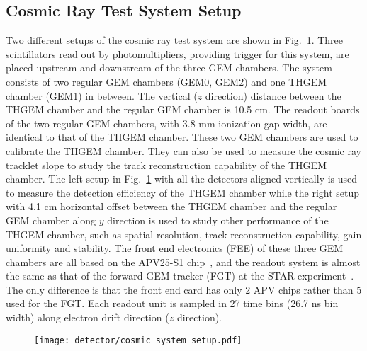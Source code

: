 \subsection{Cosmic Ray Test System Setup}\label{systemsetup}
Two different setups of the cosmic ray test system are shown in Fig.~\ref{cosmic_system_setup}. Three scintillators read out by photomultipliers, providing trigger for this system, are placed upstream and downstream of the three GEM chambers. The system consists of two regular GEM chambers (GEM0, GEM2) and one THGEM chamber (GEM1) in between. The vertical ($z$ direction) distance between the THGEM chamber and the regular GEM chamber is 10.5 cm. The readout boards of the two regular GEM chambers, with 3.8 mm ionization gap width, are identical to that of  the THGEM chamber. These two GEM chambers are used to calibrate the THGEM chamber. They can also be used to measure the cosmic ray tracklet slope to study the track reconstruction capability of the THGEM chamber. The left setup in Fig.~\ref{cosmic_system_setup} with all the detectors aligned vertically is used to measure the detection efficiency of the THGEM chamber while the right setup with 4.1 cm horizontal offset between the THGEM chamber and the regular GEM chamber along $y$ direction is used to study other performance of the THGEM chamber, such as spatial resolution, track reconstruction capability,  gain uniformity and stability. The front end electronics (FEE) of these three GEM chambers are all based on the APV25-S1 chip~\cite{apv}, and the readout system is almost the same as that of the forward GEM tracker (FGT) at the STAR experiment~\cite{fgtreadout}. The only difference is that the front end card has only 2 APV chips rather than 5 used for the FGT. Each readout unit is sampled in 27 time bins (26.7 ns bin width) along electron drift direction ($z$ direction).

\begin{figure}[htbp]
\centering
\texttt{[image: detector/cosmic\_system\_setup.pdf]}
 \label{cosmic_system_setup}
\end{figure}

